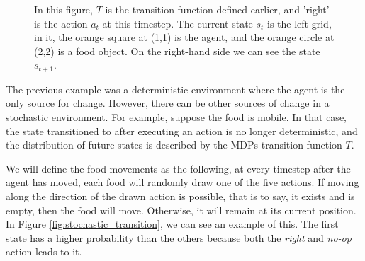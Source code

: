 \documentclass[12pt,A4]{report}
\theoremstyle{definition}
\begin{document}
\begin{figure}
\[  \]
  \caption{In this figure, $T$ is the transition function defined earlier, and 'right' is the action $a_t$ at this timestep. The current state $s_t$ is the left grid, in it, the orange square at (1,1) is the agent, and the orange circle at (2,2) is a food object. On the right-hand side we can see the state $s_{t+1}$.}
  \label{fig:simple_transition}
\end{figure}



The previous example was a deterministic environment where the agent is the only source for change. However, there can be other sources of change in a stochastic environment. For example, suppose the food is mobile. In that case, the state transitioned to after executing an action is no longer deterministic, and the distribution of future states is described by the MDPs transition function $T$.

We will define the food movements as the following, at every timestep after the agent has moved, each food will randomly draw one of the five actions. If moving along the direction of the drawn action is possible, that is to say, it exists and is empty, then the food will move. Otherwise, it will remain at its current position. In Figure \ref{fig:stochastic_transition}, we can see an example of this. The first state has a higher probability than the others because both the \textit{right} and \textit{no-op} action leads to it. 
\end{document}
